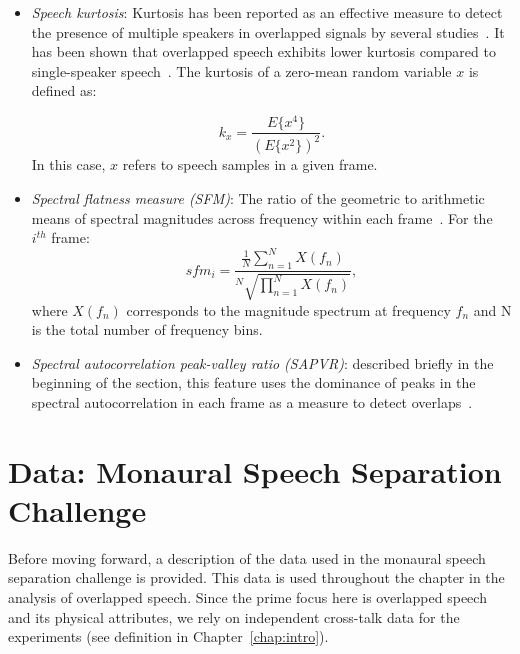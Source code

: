 \begin{itemize}
	\item {\it Speech kurtosis}: Kurtosis has been reported as an effective measure to detect the presence of multiple speakers in overlapped signals by several studies~\cite{Wrigley_05,boakye_thesis,temple_kurtosis}. 
	It has been shown that overlapped speech exhibits lower kurtosis compared to single-speaker speech~\cite{leblanc_deleon98}. The kurtosis of a zero-mean random variable $x$ is defined as:
	
	\begin{equation}
	\label{eq:kurtosis}
	k_x = \frac{E\{x^4\}}{(E\{x^2\})^2}.
	\end{equation}
	\vspace{1mm}
	In this case, $x$ refers to speech samples in a given frame. 
	\item {\it Spectral flatness measure (SFM)}: The ratio of the geometric to arithmetic means of spectral magnitudes across frequency within each frame~\cite{nav_icassp13}. For the $i^{th}$ frame:
	\begin{equation}
	\label{eq:kurtosis}
	sfm_i = \frac{\frac{1}{N}\sum_{n=1}^{N}{X(f_n)}}{^N\sqrt{\prod_{n=1}^{N}{X(f_n)}}},
	\end{equation}
	\vspace{1mm}
	where $X(f_n)$ corresponds to the magnitude spectrum at frequency $f_n$ and {N} is the total number of frequency bins. 
	\item {\it Spectral autocorrelation peak-valley ratio (SAPVR)}: described briefly in the beginning of the section, this feature uses the dominance of peaks in the spectral autocorrelation in each frame as a measure to detect overlaps~\cite{sapvr_2000}. 
\end{itemize}

\newpage
\section{Data: Monaural Speech Separation Challenge}
\label{sec:data}
Before moving forward, a description of the data used in the monaural speech separation challenge is provided. 
This data is used throughout the chapter in the analysis of overlapped speech. 
Since the prime focus here is overlapped speech and its physical attributes, we rely on independent cross-talk data for the experiments (see definition in Chapter~\ref{chap:intro}). 

